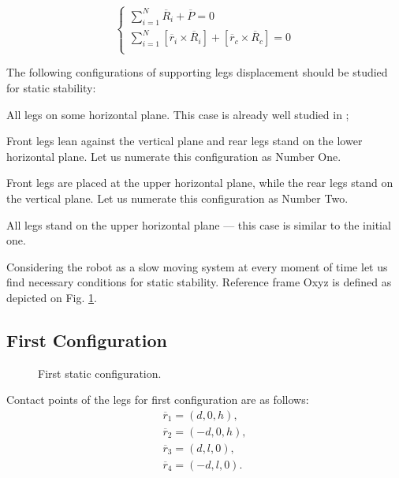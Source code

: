 \documentclass{ws-procs9x6}
\begin{document}
\begin{equation}
  \left\{
    \begin{array}{cc}
    \sum\limits^N_{i=1}\overline{R}_i + \overline{P} = 0\\
    \sum\limits^N_{i=1}[\overline{r}_i\times\overline{R}_i] + [\overline{r}_c\times\overline{R}_c] = 0\\
    \end{array}
  \right.
  \label{eq:eq1}
\end{equation}

  
The following configurations of supporting legs displacement should be studied for static stability:
\begin{itemlist}
  \item All legs on some horizontal plane. This case is already well studied in ;
  \item Front legs lean against the vertical plane and rear legs stand on the lower horizontal plane. Let us numerate this configuration as Number One.
  \item Front legs are placed at the upper horizontal plane, while the rear legs stand on the vertical plane. Let us numerate this configuration as Number Two.
  \item All legs stand on the upper horizontal plane –-- this case is similar to the initial one.
\end{itemlist}
  
  Considering the robot as a slow moving system at every moment of time let us find necessary conditions for static stability. 
  Reference frame Oxyz is defined as depicted on Fig. \ref{aba:configuration_1}.

\subsection{First Configuration}

\begin{figure}
  \begin{center}
  \end{center}
  \caption{First static configuration.}
  \label{aba:configuration_1}
\end{figure}

Contact points of the legs for first configuration are as follows:
\begin{equation}
  \begin{array}{l}
    \overline{r}_1 = (d,0,h),\\
    \overline{r}_2 = (-d,0,h),\\
    \overline{r}_3 = (d,l,0),\\
    \overline{r}_4 = (-d,l,0).\\
  \end{array}
\end{equation}
\end{document}
